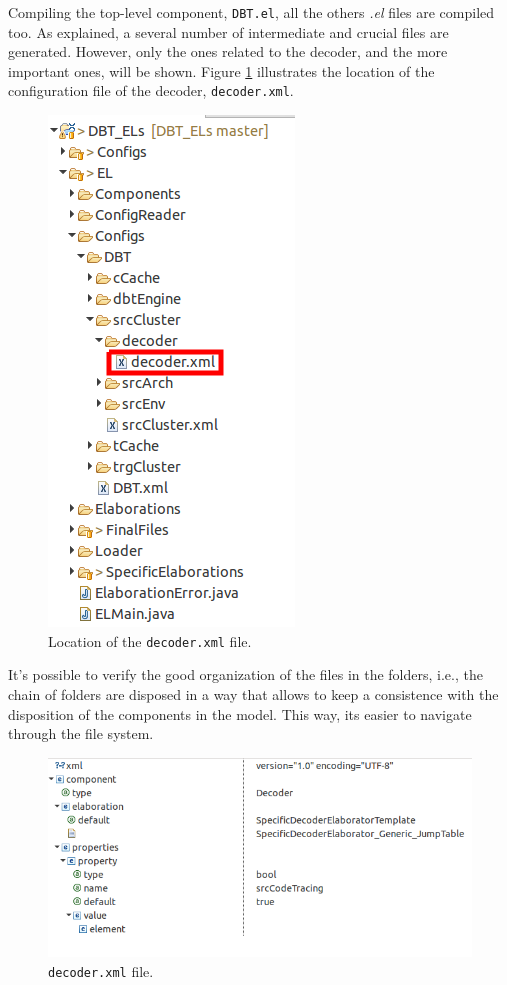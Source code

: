\documentclass[12pt]{article}
\begin{document}
{Compiling the top-level component, \texttt{DBT.el}, all the others \textit{.el} files are compiled too. As explained, a several number of intermediate and crucial files are generated. However, only the ones related to the decoder, and the more important ones, will be shown. Figure \ref{fig:decoder_xml} illustrates the location of the configuration file of the decoder, \texttt{decoder.xml}.

\begin{figure}[H]
\centerline{
\includegraphics[scale=0.38]{images/decoder}
}
\caption{Location of the \texttt{decoder.xml} file.}
\label{fig:decoder_xml} 
\end{figure}

It's possible to verify the good organization of the files in the folders, i.e., the chain of folders are disposed in a way that allows to keep a consistence with the disposition of the components in the model. This way, its easier to navigate through the file system.

\begin{figure}[H]
\centerline{
\includegraphics[scale=0.38]{images/decoder2}
}
\caption{\texttt{decoder.xml} file.}
\label{fig:decoder_xml2} 
\end{figure}
 
}
\end{document}
